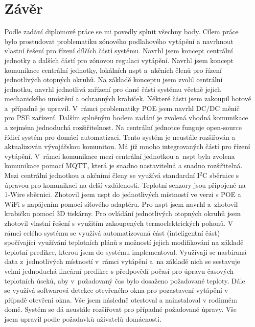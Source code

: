 \chapter{Závěr}
Podle zadání diplomové práce se mi povedly splnit všechny body. Cílem práce bylo prostudovat problematiku zónového podlahového vytápění a navrhnout vlastní řešení pro řízení dílčích částí systému. Navrhl jsem koncept centrální jednotky a dalších částí pro zónovou regulaci vytápění. Navrhl jsem koncept komunikace centrální jednotky, lokálních \acrshort{nspt} a~akčních členů pro řízení jednotlivých otopných okruhů. Na základě konceptu jsem zvolil centrální jednotku, navrhl jednotlivá zařízení pro dané části systému včetně jejich mechanického umístění a ochranných krabiček. Některé části jsem zakoupil hotové a~případně je upravil. V~rámci problematiky POE jsem navrhl DC/DC měnič pro PSE zařízení. Dalším splněným bodem zadání je zvolená vhodná komunikace a zejména jednoduchá rozšiřitelnost. Na centrální jednotce funguje open-source řídicí systém pro domácí automatizaci. Tento systém je neustále rozšiřován a aktualizován vývojářskou komunitou. Má již mnoho integrovaných částí pro řízení vytápění. V~rámci komunikace mezi centrální jednotkou a~\acrshort{nspt} byla zvolena komunikace pomocí MQTT, která je snadno nastavitelná a snadno rozšiřitelná. Mezi centrální jednotkou a akčními členy se využívá standardní I$^2$C sběrnice s úpravou pro komunikaci na delší vzdálenosti. Teplotní senzory jsou připojené na 1-Wire sběrnici. Zhotovil jsem \acrshort{nspt} do jednotlivých místností ve verzi s POE a WiFi s napájením pomocí síťového adaptéru. Pro \acrshort{nspt} jsem navrhl a~zhotovil krabičku pomocí 3D tiskárny. Pro ovládání jednotlivých otopných okruhů jsem zhotovil vlastní řešení s využitím zakoupených termoelektrických pohonů. V rámci celého systému se využívá automatizovaná část (inteligentní část) spočívající využívání teplotních plánů s možností jejich modifikování na základě teplotní predikce, kterou jsem do systému implementoval. Využívají se nasbíraná data z~jednotlivých místností v~rámci vytápění a~na základě nich se sestavuje velmi jednoduchá lineární predikce s předpovědí počasí pro úpravu časových teplotních úseků, aby v~požadovaný čas bylo dosaženo požadované teploty. Dále se využívá softwarová detekce otevřeného okna pro pozastavení vytápění v případě otevření okna. Vše jsem následně otestoval a nainstaloval v rodinném domě. Systém se dá neustále rozšiřovat pro případné požadované úpravy. Vše jsem upravil podle požadavků uživatelů domácnosti. 

